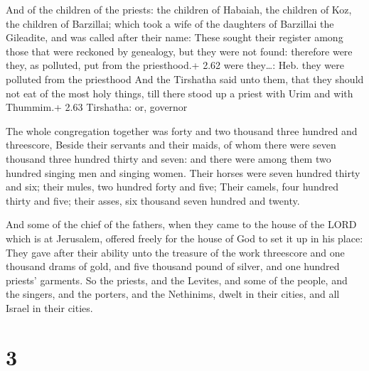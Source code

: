  And of the children of the priests: the children of
Habaiah, the children of Koz, the children of Barzillai; which took a
wife of the daughters of Barzillai the Gileadite, and was called after
their name:  These sought their register among those that
were reckoned by genealogy, but they were not found: therefore were
they, as polluted, put from the priesthood.+ 2.62 were they\ldots: Heb.
they were polluted from the priesthood  And the Tirshatha
said unto them, that they should not eat of the most holy things, till
there stood up a priest with Urim and with Thummim.+ 2.63 Tirshatha: or,
governor

 The whole congregation together was forty and two
thousand three hundred and threescore,  Beside their
servants and their maids, of whom there were seven thousand three
hundred thirty and seven: and there were among them two hundred singing
men and singing women.  Their horses were seven hundred
thirty and six; their mules, two hundred forty and five; 
Their camels, four hundred thirty and five; their asses, six thousand
seven hundred and twenty.

 And some of the chief of the fathers, when they came to
the house of the LORD which is at Jerusalem, offered freely for the
house of God to set it up in his place:  They gave after
their ability unto the treasure of the work threescore and one thousand
drams of gold, and five thousand pound of silver, and one hundred
priests' garments.  So the priests, and the Levites, and
some of the people, and the singers, and the porters, and the Nethinims,
dwelt in their cities, and all Israel in their cities.

\hypertarget{section-2}{%
\section{3}\label{section-2}}


